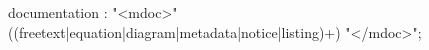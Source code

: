 \documentclass[11pt]{article}
\begin{document}
\begin{rail}
documentation : "<mdoc>" ((freetext|equation|diagram|metadata|notice|listing)+) "</mdoc>";
\end{rail}
\end{document}
